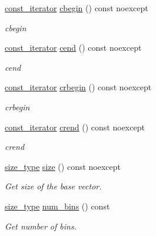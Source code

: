 \begin{DoxyCompactItemize}
\hyperlink{classIceBRG_1_1limit__vector_ae7acd983de8fc074624eb50450a01e30}{const\+\_\+iterator} \hyperlink{classIceBRG_1_1limit__vector_a90458c08bb863d24a26b2b8ff79bbdb0}{cbegin} () const  noexcept
\begin{DoxyCompactList}\small\item\em cbegin \end{DoxyCompactList}\item 
\hyperlink{classIceBRG_1_1limit__vector_ae7acd983de8fc074624eb50450a01e30}{const\+\_\+iterator} \hyperlink{classIceBRG_1_1limit__vector_a4bdda61b8d16c1aa23dc4de95dbec933}{cend} () const  noexcept
\begin{DoxyCompactList}\small\item\em cend \end{DoxyCompactList}\item 
\hyperlink{classIceBRG_1_1limit__vector_ae7acd983de8fc074624eb50450a01e30}{const\+\_\+iterator} \hyperlink{classIceBRG_1_1limit__vector_afbc08d1c3cd4928e69846b1aeef82777}{crbegin} () const  noexcept
\begin{DoxyCompactList}\small\item\em crbegin \end{DoxyCompactList}\item 
\hyperlink{classIceBRG_1_1limit__vector_ae7acd983de8fc074624eb50450a01e30}{const\+\_\+iterator} \hyperlink{classIceBRG_1_1limit__vector_a6c05d24152373919acf910bfd474cba2}{crend} () const  noexcept
\begin{DoxyCompactList}\small\item\em crend \end{DoxyCompactList}\item 
\hyperlink{classIceBRG_1_1limit__vector_a81be3eb6cd519b3f5279ef735ccc4c2f}{size\+\_\+type} \hyperlink{classIceBRG_1_1limit__vector_a13a4acf96ebfd7b8d6a5354ada368f79}{size} () const  noexcept
\begin{DoxyCompactList}\small\item\em Get size of the base vector. \end{DoxyCompactList}\item 
\hyperlink{classIceBRG_1_1limit__vector_a81be3eb6cd519b3f5279ef735ccc4c2f}{size\+\_\+type} \hyperlink{classIceBRG_1_1limit__vector_af09ecb88fd55929c0b08faa63c9a3e1c}{num\+\_\+bins} () const 
\begin{DoxyCompactList}\small\item\em Get number of bins. \end{DoxyCompactList}\item 

\end{DoxyCompactItemize}
